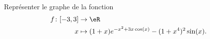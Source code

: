 \begin{exercice}\label{exoMatlab0001}

	Représenter le graphe de la fonction
	\begin{equation}
		\begin{aligned}
			f\colon \mathopen[ -3 , 3 \mathclose]&\to \eR \\
			x&\mapsto (1+x) e^{-x^2+3x\cos(x)}-(1+x^4)^2\sin(x). 
		\end{aligned}
	\end{equation}

\end{exercice}
